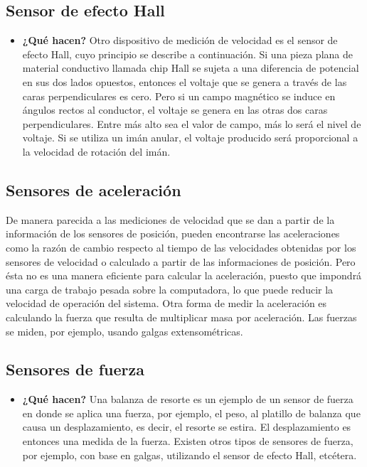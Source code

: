 \subsection*{Sensor de efecto Hall}
\begin{itemize}
	\item \textbf{¿Qué hacen?} Otro dispositivo de medición de velocidad es el sensor de efecto Hall, cuyo principio se describe a continuación. Si una pieza plana de material conductivo llamada chip Hall se sujeta a una diferencia de potencial en sus dos lados opuestos, entonces el voltaje que se genera a través de las caras perpendiculares es cero. Pero si un campo magnético se induce en ángulos rectos al conductor, el voltaje se genera en las otras dos caras perpendiculares. Entre más alto sea el valor de campo, más lo será el nivel de voltaje. Si se utiliza un imán anular, el voltaje producido será proporcional a la velocidad de rotación del imán. \cite{TE_Connectivity_Sensor}

\end{itemize}

	\begin{figure}[h]
	\centering
\end{figure}


\subsection{Sensores de aceleración} De manera parecida a las mediciones de velocidad que se dan a partir de la información de los sensores de posición, pueden encontrarse las aceleraciones como la razón de cambio respecto al tiempo de las velocidades obtenidas por los sensores de velocidad o calculado a partir de las informaciones de posición. Pero ésta no es una manera eficiente para calcular la aceleración, puesto que impondrá una carga de trabajo pesada sobre la computadora, lo que puede reducir la velocidad de operación del sistema. Otra forma de medir la aceleración es calculando la fuerza que resulta de multiplicar masa por aceleración. Las fuerzas se miden, por ejemplo, usando galgas extensométricas. 

\subsection*{Sensores de fuerza} 
\begin{itemize}
	\item \textbf{¿Qué hacen?} Una balanza de resorte es un ejemplo de un sensor de fuerza en donde se aplica una fuerza, por ejemplo, el peso, al platillo de balanza que causa un desplazamiento, es decir, el resorte se estira. El desplazamiento es entonces una medida de la fuerza. Existen otros tipos de sensores de fuerza, por ejemplo, con base en galgas, utilizando el sensor de efecto Hall, etcétera. 
\end{itemize}

